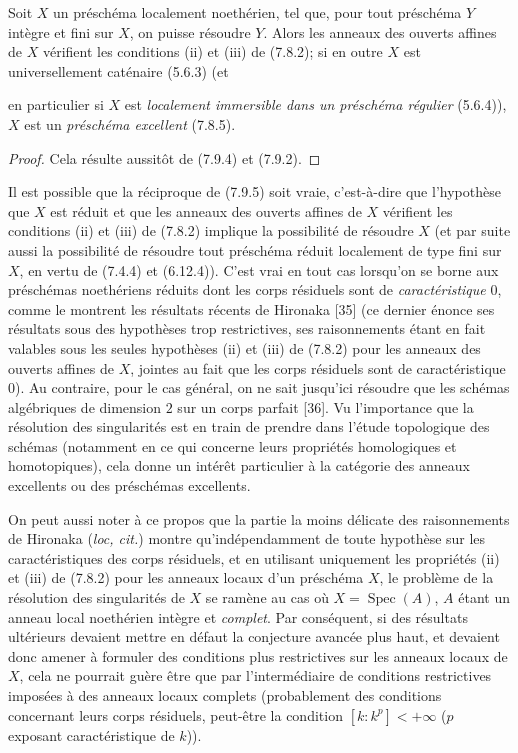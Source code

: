 \begin{proposition}[7.9.5]
\label{IV.2.s7.9.5-fr}
Soit $X$ un préschéma localement noethérien, tel que, pour tout préschéma $Y$
intègre et fini sur $X$, on puisse résoudre $Y$. Alors les anneaux des ouverts
affines de $X$ vérifient les conditions (ii) et (iii) de (7.8.2); si en outre
$X$ est universellement caténaire (5.6.3) (et


en particulier si $X$ est \emph{localement immersible dans un préschéma
régulier} (5.6.4)), $X$ est un \emph{préschéma excellent} (7.8.5).
\end{proposition}

\begin{proof}
Cela résulte aussitôt de (7.9.4) et (7.9.2).
\end{proof}

\begin{remark}[7.9.6]
\label{IV.2.s7.9.6-fr}
Il est possible que la réciproque de (7.9.5) soit vraie, c'est-à-dire que
l'hypothèse que $X$ est réduit et que les anneaux des ouverts affines de $X$
vérifient les conditions (ii) et (iii) de (7.8.2) implique la possibilité de
résoudre $X$ (et par suite aussi la possibilité de résoudre tout préschéma
réduit localement de type fini sur $X$, en vertu de (7.4.4) et (6.12.4)).
C'est vrai en tout cas lorsqu'on se borne aux préschémas noethériens réduits
dont les corps résiduels sont de \emph{caractéristique} $0$, comme le montrent
les résultats récents de Hironaka [35] (ce dernier énonce ses résultats sous
des hypothèses trop restrictives, ses raisonnements étant en fait valables
sous les seules hypothèses (ii) et (iii) de (7.8.2) pour les anneaux des
ouverts affines de $X$, jointes au fait que les corps résiduels sont de
caractéristique $0$). Au contraire, pour le cas général, on ne sait jusqu'ici
résoudre que les schémas algébriques de dimension $2$ sur un corps parfait
[36]. Vu l'importance que la résolution des singularités est en train de
prendre dans l'étude topologique des schémas (notamment en ce qui concerne
leurs propriétés homologiques et homotopiques), cela donne un intérêt
particulier à la catégorie des anneaux excellents ou des préschémas
excellents.

On peut aussi noter à ce propos que la partie la moins délicate des
raisonnements de Hironaka (\emph{loc, cit.}) montre qu'indépendamment de toute
hypothèse sur les caractéristiques des corps résiduels, et en utilisant
uniquement les propriétés (ii) et (iii) de (7.8.2) pour les anneaux locaux
d'un préschéma $X$, le problème de la résolution des singularités de $X$ se
ramène au cas où $X=\operatorname{Spec}(A)$, $A$ étant un anneau local
noethérien intègre et \emph{complet}. Par conséquent, si des résultats
ultérieurs devaient mettre en défaut la conjecture avancée plus haut, et
devaient donc amener à formuler des conditions plus restrictives sur les
anneaux locaux de $X$, cela ne pourrait guère être que par l'intermédiaire de
conditions restrictives imposées à des anneaux locaux complets (probablement
des conditions concernant leurs corps résiduels, peut-être la condition
$[k:k^p]<+\infty$ ($p$ exposant caractéristique de $k$)).
\end{remark}


